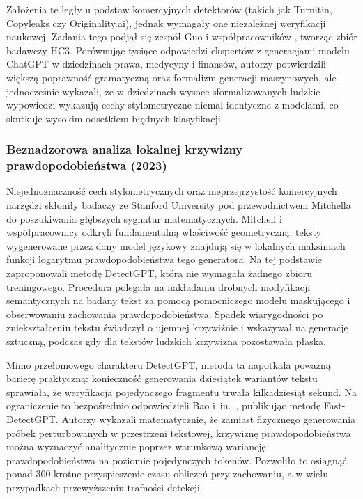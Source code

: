 Założenia te legły u podstaw komercyjnych detektorów (takich jak Turnitin, Copyleaks czy Originality.ai), jednak wymagały one niezależnej weryfikacji naukowej. Zadania tego podjął się zespół Guo i współpracowników \cite{guo2023hc3}, tworząc zbiór badawczy HC3. Porównując tysiące odpowiedzi ekspertów z generacjami modelu ChatGPT w dziedzinach prawa, medycyny i finansów, autorzy potwierdzili większą poprawność gramatyczną oraz formalizm generacji maszynowych, ale jednocześnie wykazali, że w dziedzinach wysoce sformalizowanych ludzkie wypowiedzi wykazują cechy stylometryczne niemal identyczne z modelami, co skutkuje wysokim odsetkiem błędnych klasyfikacji.

\subsubsection{Beznadzorowa analiza lokalnej krzywizny prawdopodobieństwa (2023)}

Niejednoznaczność cech stylometrycznych oraz nieprzejrzystość komercyjnych narzędzi skłoniły badaczy ze Stanford University pod przewodnictwem Mitchella~\cite{mitchell2023detectgpt} do poszukiwania głębszych sygnatur matematycznych. Mitchell i współpracownicy odkryli fundamentalną właściwość geometryczną: teksty wygenerowane przez dany model językowy znajdują się w lokalnych maksimach funkcji logarytmu prawdopodobieństwa tego generatora. Na tej podstawie zaproponowali metodę DetectGPT, która nie wymagała żadnego zbioru treningowego. Procedura polegała na nakładaniu drobnych modyfikacji semantycznych na badany tekst za pomocą pomocniczego modelu maskującego i obserwowaniu zachowania prawdopodobieństwa. Spadek wiarygodności po zniekształceniu tekstu świadczył o ujemnej krzywiźnie i wskazywał na generację sztuczną, podczas gdy dla tekstów ludzkich krzywizna pozostawała płaska.

Mimo przełomowego charakteru DetectGPT, metoda ta napotkała poważną barierę praktyczną: konieczność generowania dziesiątek wariantów tekstu sprawiała, że weryfikacja pojedynczego fragmentu trwała kilkadziesiąt sekund. Na ograniczenie to bezpośrednio odpowiedzieli Bao i~in.~\cite{bao2023fastdetectgpt}, publikując metodę Fast-DetectGPT. Autorzy wykazali matematycznie, że zamiast fizycznego generowania próbek perturbowanych w przestrzeni tekstowej, krzywiznę prawdopodobieństwa można wyznaczyć analitycznie poprzez warunkową wariancję prawdopodobieństwa na poziomie pojedynczych tokenów. Pozwoliło to osiągnąć ponad 300-krotne przyspieszenie czasu obliczeń przy zachowaniu, a w wielu przypadkach przewyższeniu trafności detekcji.

